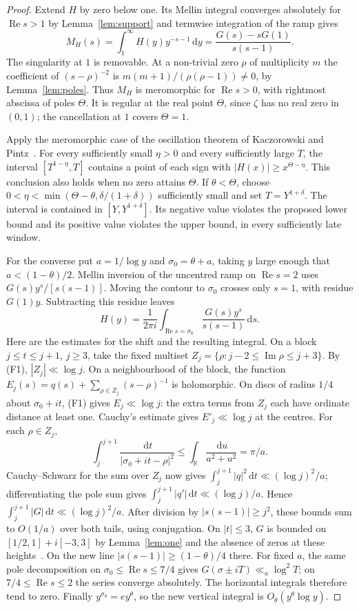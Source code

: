 \documentclass[11pt]{amsart}
\theoremstyle{remark}
\theoremstyle{definition}
\newcommand{\dd}{\,\mathrm{d}}
\renewcommand{\Re}{\operatorname{Re}}
\renewcommand{\Im}{\operatorname{Im}}
\begin{document}
\begin{proof}
Extend $H$ by zero below one. Its Mellin integral converges absolutely for
$\Re s>1$ by Lemma~\ref{lem:support} and termwise integration of the ramp gives
\[
 M_H(s)=\int_1^\infty H(y)y^{-s-1}\dd y
       =\frac{G(s)-sG(1)}{s(s-1)} .
\]
The singularity at $1$ is removable. At a non-trivial zero $\rho$ of
multiplicity $m$ the coefficient of $(s-\rho)^{-2}$ is
$m(m+1)/(\rho(\rho-1))\ne0$, by Lemma~\ref{lem:poles}.
Thus $M_H$ is meromorphic for $\Re s>0$, with rightmost abscissa of poles
$\Theta$. It is regular at the real point $\Theta$, since $\zeta$ has no real
zero in $(0,1)$; the cancellation at $1$ covers $\Theta=1$.

Apply the meromorphic case of the oscillation theorem of Kaczorowski and
Pintz~\cite[Thm.~1, (2.2)--(2.3), and Cor.~1]{KP86}. For every sufficiently
small $\eta>0$ and every sufficiently large $T$, the interval
$[T^{1-\eta},T]$ contains a point of each sign with $|H(x)|\ge x^{\Theta-\eta}$.
This conclusion also holds when no zero attains $\Theta$. If $\theta<\Theta$,
choose $0<\eta<\min(\Theta-\theta,\delta/(1+\delta))$ sufficiently small
and set $T=Y^{1+\delta}$. The interval is contained in $[Y,Y^{1+\delta}]$.
Its negative value violates the proposed lower bound and its positive value
violates the upper bound, in every sufficiently late window.

For the converse put $a=1/\log y$ and $\sigma_0=\theta+a$, taking $y$ large
enough that $a<(1-\theta)/2$. Mellin inversion of the uncentred ramp on
$\Re s=2$ uses $G(s)y^s/[s(s-1)]$. Moving the contour to $\sigma_0$
crosses only $s=1$, with residue $G(1)y$. Subtracting this residue leaves
\[
 H(y)=\frac1{2\pi i}\int_{\Re s=\sigma_0}\frac{G(s)y^s}{s(s-1)}\dd s .
\]
Here are the estimates for the shift and the resulting integral. On a block
$j\le t\le j+1$, $j\ge3$, take the fixed multiset
$Z_j=\{\rho:j-2\le\Im\rho\le j+3\}$. By (F1), $|Z_j|\ll\log j$.
On a neighbourhood of the block, the function
$E_j(s)=q(s)+\sum_{\rho\in Z_j}(s-\rho)^{-1}$ is holomorphic.
On discs of radius $1/4$ about $\sigma_0+it$, (F1) gives $E_j\ll\log j$:
the extra terms from $Z_j$ each have ordinate distance at least one.
Cauchy's estimate gives $E'_j\ll\log j$ at the centres. For each $\rho\in Z_j$,
\[
 \int_j^{j+1}\frac{\dd t}{|\sigma_0+it-\rho|^2}
 \le\int_{\mathbb R}\frac{\dd u}{a^2+u^2}=\pi/a .
\]
Cauchy--Schwarz for the sum over $Z_j$ now gives
$\int_j^{j+1}|q|^2\dd t\ll (\log j)^2/a$; differentiating the pole sum gives
$\int_j^{j+1}|q'|\dd t\ll(\log j)/a$. Hence
$\int_j^{j+1}|G|\dd t\ll (\log j)^2/a$.
After division by $|s(s-1)|\ge j^2$, these bounds sum to $O(1/a)$
over both tails, using conjugation. On $|t|\le3$, $G$ is bounded on
$[1/2,1]+i[-3,3]$ by Lemma~\ref{lem:one} and the absence of zeros at these
heights~\cite{PT21}. On the new line $|s(s-1)|\ge(1-\theta)/4$ there.
For fixed $a$, the same pole decomposition on
$\sigma_0\le\Re s\le7/4$ gives $G(\sigma\pm iT)\ll_a\log^2 T$;
on $7/4\le\Re s\le2$ the series converge absolutely. The horizontal
integrals therefore tend to zero. Finally $y^{\sigma_0}=e y^\theta$,
so the new vertical integral is $O_\theta(y^\theta\log y)$.
\end{proof}
\end{document}
